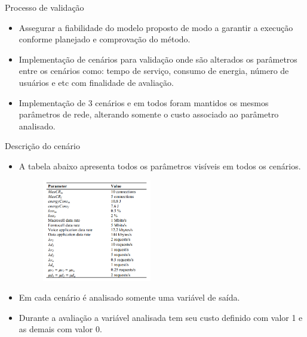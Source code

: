 \begin{frame}
  \begin{block}{Processo de validação}
    \begin{itemize}
      \item Assegurar a fiabilidade do modelo proposto de  modo a garantir a execução conforme planejado e comprovação do método.
      \newline
      \item Implementação de cenários para validação onde são alterados os parâmetros entre os cenários como:  tempo de serviço, consumo de energia, número de usuários e etc com finalidade de avaliação.
      \newline
      \item Implementação de 3 cenários e em todos foram mantidos os mesmos parâmetros de rede, alterando somente o custo associado ao parâmetro analisado.     
    \end{itemize}
  \end{block}
\end{frame}

\begin{frame}{Descrição do cenário}
  \begin{itemize}
    \item \scriptsize A tabela abaixo apresenta todos os parâmetros visíveis em todos os cenários.
  \begin{figure}
    \includegraphics [width=0.45\textwidth]{./Figures/val_1}
  \end{figure} 
    \item \scriptsize Em cada cenário é analisado somente uma variável de saída.
    \item \scriptsize Durante a avaliação a variável analisada tem seu custo definido com valor 1 e as demais com valor 0.
  \end{itemize}    
\end{frame}

